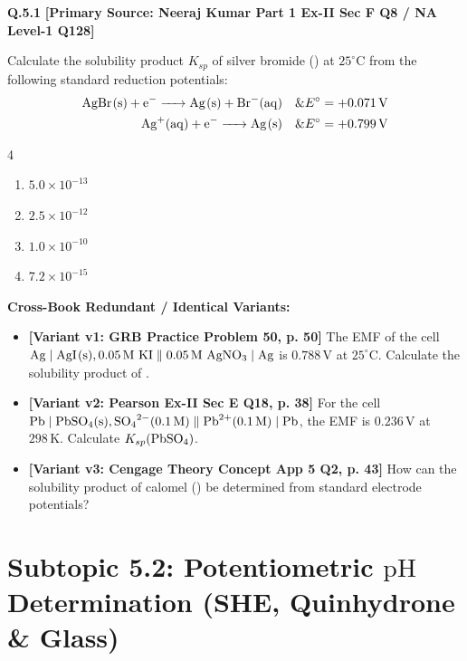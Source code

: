 \begin{problembox}
\textbf{Q.5.1} \hfill \textbf{[Primary Source: Neeraj Kumar Part 1 Ex-II Sec F Q8 / NA Level-1 Q128]}
\label{q:qb-c5-01}

Calculate the solubility product $K_{sp}$ of silver bromide () at $25^\circ\text{C}$ from the following standard reduction potentials:
\begin{align*}
    \ce{AgBr(s) + e^- -> Ag(s) + Br^-(aq)} \quad \& E^\circ = +0.071\,\text{V} \\
    \ce{Ag+(aq) + e^- -> Ag(s)} \quad \& E^\circ = +0.799\,\text{V}
\end{align*}
\begin{multicols}{4}
\begin{enumerate}[label=(\alph*)]
    \item $5.0 \times 10^{-13}$
    \item $2.5 \times 10^{-12}$
    \item $1.0 \times 10^{-10}$
    \item $7.2 \times 10^{-15}$
\end{enumerate}
\end{multicols}

\tcbline
\textbf{\color{accentamber}Cross-Book Redundant / Identical Variants:}
\begin{itemize}[leftmargin=*,itemsep=2pt]
    \item \textbf{[Variant v1: GRB Practice Problem 50, p. 50]} The EMF of the cell $\ce{Ag} \mid \ce{AgI(s)}, 0.05\,\text{M } \ce{KI} \parallel 0.05\,\text{M } \ce{AgNO3} \mid \ce{Ag}$ is $0.788\,\text{V}$ at $25^\circ\text{C}$. Calculate the solubility product of .
    \item \textbf{[Variant v2: Pearson Ex-II Sec E Q18, p. 38]} For the cell $\ce{Pb} \mid \ce{PbSO4(s)}, \ce{SO4^2-}(0.1\,\text{M}) \parallel \ce{Pb^2+}(0.1\,\text{M}) \mid \ce{Pb}$, the EMF is $0.236\,\text{V}$ at $298\,\text{K}$. Calculate $K_{sp}(\ce{PbSO4})$.
    \item \textbf{[Variant v3: Cengage Theory Concept App 5 Q2, p. 43]} How can the solubility product of calomel () be determined from standard electrode potentials?
\end{itemize}
\end{problembox}

\section{Subtopic 5.2: Potentiometric $\text{pH}$ Determination (SHE, Quinhydrone \& Glass)}

